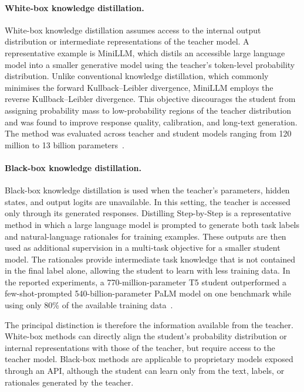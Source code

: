 \paragraph{White-box knowledge distillation.}
White-box knowledge distillation assumes access to the internal output
distribution or intermediate representations of the teacher model.
A representative example is MiniLLM, which distils an accessible
large language model into a smaller generative model using the
teacher's token-level probability distribution. Unlike conventional
knowledge distillation, which commonly minimises the forward
Kullback--Leibler divergence, MiniLLM employs the reverse
Kullback--Leibler divergence. This objective discourages the student
from assigning probability mass to low-probability regions of the
teacher distribution and was found to improve response quality,
calibration, and long-text generation. The method was evaluated across
teacher and student models ranging from 120 million to 13 billion
parameters~\cite{gu2024minillm}.

\paragraph{Black-box knowledge distillation.}
Black-box knowledge distillation is used when the teacher's parameters,
hidden states, and output logits are unavailable. In this setting, the
teacher is accessed only through its generated responses. Distilling
Step-by-Step is a representative method in which a large language
model is prompted to generate both task labels and natural-language
rationales for training examples. These outputs are then used as
additional supervision in a multi-task objective for a smaller student
model. The rationales provide intermediate task knowledge that is not
contained in the final label alone, allowing the student to learn with
less training data. In the reported experiments, a 770-million-parameter
T5 student outperformed a few-shot-prompted 540-billion-parameter PaLM
model on one benchmark while using only 80\% of the available training
data~\cite{hsieh2023distilling}.

The principal distinction is therefore the information available from
the teacher. White-box methods can directly align the student's
probability distribution or internal representations with those of the
teacher, but require access to the teacher model. Black-box methods are
applicable to proprietary models exposed through an API, although the
student can learn only from the text, labels, or rationales generated
by the teacher.



